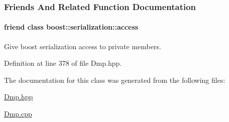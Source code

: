 \subsubsection{Friends And Related Function Documentation}
\hypertarget{classDmpBbo_1_1Dmp_ac98d07dd8f7b70e16ccb9a01abf56b9c}{
\paragraph[{boost\+::serialization\+::access}]{\setlength{\rightskip}{0pt plus 5cm}friend class boost\+::serialization\+::access\hspace{0.3cm}{\ttfamily [friend]}}}\label{classDmpBbo_1_1Dmp_ac98d07dd8f7b70e16ccb9a01abf56b9c}


Give boost serialization access to private members. 



Definition at line 378 of file Dmp.\+hpp.



The documentation for this class was generated from the following files\+:\begin{DoxyCompactItemize}
\item 
\hyperlink{Dmp_8hpp}{Dmp.\+hpp}\item 
\hyperlink{Dmp_8cpp}{Dmp.\+cpp}\end{DoxyCompactItemize}
